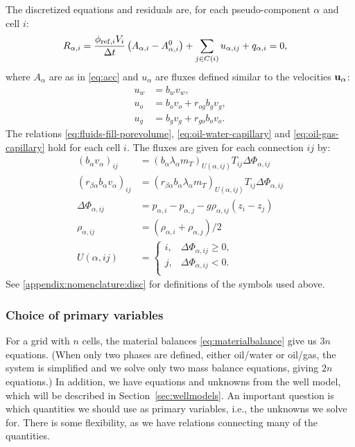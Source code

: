 The discretized equations and residuals are, for each
pseudo-component $\alpha$ and cell $i$:
\begin{align}\label{eq:materialbalance}
  R_{\alpha,i} = \frac{\phi_{{\rm ref},i} V_i}{\Delta t} \left( A_{\alpha,i} -
A_{\alpha,i}^0\right)
  + \sum_{j \in C(i)} u_{\alpha,ij} + q_{\alpha,i} & = 0,
\end{align}
where $A_\alpha$ are as in \eqref{eq:acc} and 
$u_\alpha$ are fluxes defined similar to the velocities ${\bf u}_\alpha$:
\begin{subequations}
\begin{align}
 u_w &= b_{w} v_{w}, \\
 u_o &= b_{o} v_{o} + r_{og}b_{g}v_{g}, \\
 u_g &= b_{g} v_{g} + r_{go}b_{o}v_{o}.
\end{align}
\end{subequations}
The relations \eqref{eq:fluids-fill-porevolume},
\eqref{eq:oil-water-capillary} and \eqref{eq:oil-gas-capillary} hold
for each cell $i$.
The fluxes are given for each connection $ij$ by:
\begin{align}
  (b_{\alpha} v_{\alpha})_{ij}
  & = (b_\alpha \lambda_{\alpha} m_T)_{U(\alpha, ij)}
    T_{ij} \Delta \Phi_{\alpha, ij} \label{eq:flux1} \\
  (r_{\beta\alpha} b_{\alpha} v_{\alpha})_{ij}
  & = (r_{\beta\alpha} b_\alpha \lambda_{\alpha} m_T)_{U(\alpha, ij)}
    T_{ij} \Delta \Phi_{\alpha, ij} \label{eq:flux2} \\
  \Delta \Phi_{\alpha,ij} & = p_{\alpha,i} - p_{\alpha,j}
                         - g \rho_{\alpha,ij} (z_i - z_j) \label{eq:head} \\
  \rho_{\alpha,ij} & = (\rho_{\alpha,i} + \rho_{\alpha,j})/2 \\
  U(\alpha, ij) & = \begin{cases}
       i, & \Delta \Phi_{\alpha,ij} \geq 0, \\
       j, & \Delta \Phi_{\alpha,ij} < 0. \\
     \end{cases}
\end{align}
See \ref{appendix:nomenclature:disc} for definitions of the
symbols used above. 


\subsubsection{Choice of primary variables}

For a grid with $n$ cells, the material balances \eqref{eq:materialbalance} give us $3n$
equations. (When only two phases are defined, either oil/water or oil/gas, the system is
simplified and we solve only two mass balance equations, giving {\revised $2n$} equations.)
In addition, we
have equations and unknowns from the well model, which will be
described in Section~\ref{sec:wellmodels}. An important question
is which quantities we should use as primary variables, i.e., the
unknowns we solve for. There is some flexibility, as we have
relations connecting many of the quantities.

